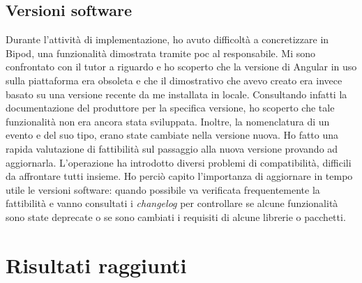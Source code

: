 \subsection{Versioni software}
Durante l'attività di implementazione, ho avuto difficoltà a concretizzare in Bipod, una funzionalità dimostrata tramite \acrshort{poc} al responsabile. Mi sono confrontato con il tutor a riguardo e ho scoperto che la versione di Angular in uso sulla piattaforma era obsoleta e che il dimostrativo che avevo creato era invece basato su una versione recente da me installata in locale. Consultando infatti la documentazione del produttore per la specifica versione, ho scoperto che tale funzionalità non era ancora stata sviluppata. Inoltre, la nomenclatura di un evento e del suo tipo, erano state cambiate nella versione nuova.
Ho fatto una rapida valutazione di fattibilità sul passaggio alla nuova versione provando ad aggiornarla. L'operazione ha introdotto diversi problemi di compatibilità, difficili da affrontare tutti insieme. Ho perciò capito l'importanza di aggiornare in tempo utile le versioni software: quando possibile va verificata frequentemente la fattibilità e vanno consultati i \textit{changelog} per controllare se alcune funzionalità sono state deprecate o se sono cambiati i requisiti di alcune librerie o pacchetti.
\section{Risultati raggiunti}
